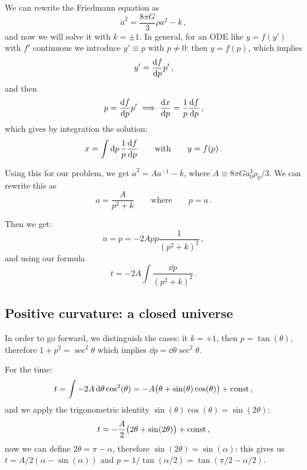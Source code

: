 \documentclass[main.tex]{subfiles}
\begin{document}
We can rewrite the Friedmann equation as 
%
\begin{equation}
  \dot{a}^2 = \frac{8 \pi G}{3} \rho a^2 - k
\,,
\end{equation}
%
and now we will solve it with \(k = \pm 1\).
In general, for an ODE like \(y = f(y')\) with \(f'\) continuous we introduce \(y' \equiv p\) with \(p \neq 0\): then \(y = f(p)\), which implies 
%
\begin{equation}
  y' = \dv{f}{p} p'
\,,
\end{equation}
%
and then 
%
\begin{equation}
  p = \dv{f}{p} p' \implies \dv{x}{p} = \frac{1}{p} \dv{f}{p}
\,,
\end{equation}
%
which gives by integration the solution: 
%
\begin{equation}
  x = \int  \dd{p} \frac{1}{p} \dv{f}{p}
  \qquad \text{with} \qquad
  y = f(p)
\,.
\end{equation}

Using this for our problem, we get \(\dot{a}^2 = A a^{-1} - k \), where \(A \equiv 8 \pi G a_0^3 \rho_0 /3\). We can rewrite this as 
%
\begin{equation}
  a = \frac{A}{p^2+k} 
  \qquad \text{where} \qquad
  p = \dot{a} 
\,.
\end{equation}

Then we get: 
%
\begin{equation}
  \dot{a} = p = -2A  p \dot{p} \frac{1}{(p^2+k)^2}
\,,
\end{equation}
%
and using our formula 
%
\begin{equation}
  t = -2A \int \frac{\dd{p} }{(p^2+k)^2}
\,.
\end{equation}

\subsection{Positive curvature: a closed universe}

In order to go forward, we distinguish the cases: it \(k = +1\), then \(p = \tan(\theta ) \), therefore \(1 + p^2= \sec^2 \theta \) which implies \(\dd{p} = \dd{\theta } \sec^2 \theta  \).

For the time: 
%
\begin{equation}
  t = \int -2A \dd{\theta } \cos^2(\theta ) = -A \qty(\theta + \sin(\theta ) \cos(\theta ) ) + \text{const}
\,,
\end{equation}
%
and we apply the trigonometric identity \(\sin(\theta ) \cos(\theta ) = \sin(2 \theta ) \):
%
\begin{equation}
  t = -\frac{A}{2} \qty(2 \theta  + \sin(2 \theta ) ) + \text{const}
\,,
\end{equation}
%
now we can define \(2 \theta  = \pi - \alpha \), therefore \(\sin(2\theta ) = \sin(\alpha )  \): this gives us
\(t = A/2 (\alpha - \sin(\alpha ) )\) and \(p = 1/\tan(\alpha /2) = \tan(\pi /2 - \alpha /2) \).
\end{document}
